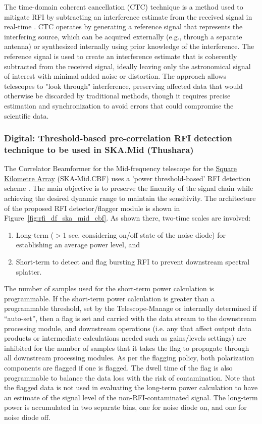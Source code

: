 The time-domain coherent cancellation (CTC) technique is a method used to mitigate RFI by subtracting an interference estimate from the received signal in real-time \cite{ellingson2022coherent}. CTC operates by generating a reference signal that represents the interfering source, which can be acquired externally (e.g., through a separate antenna) or synthesized internally using prior knowledge of the interference. The reference signal is used to create an interference estimate that is coherently subtracted from the received signal, ideally leaving only the astronomical signal of interest with minimal added noise or distortion. The approach allows telescopes to "look through" interference, preserving affected data that would otherwise be discarded by traditional methods, though it requires precise estimation and synchronization to avoid errors that could compromise the scientific data.

\subsubsection{Digital: Threshold-based pre-correlation RFI detection technique to be used in SKA.Mid (Thushara)}
\label{subsection:hardware:catalog:ska-mid}

The Correlator Beamformer for the Mid-frequency telescope for the \href{https://www.skao.int/en}{Square Kilometre Array} (SKA-Mid.CBF) uses a 'power threshold-based' RFI detection scheme \cite{ska_mid_cbf_rfi_2019}. The main objective is to preserve the linearity of the signal chain while achieving the desired dynamic range to maintain the sensitivity. The architecture of the proposed RFI detector/flagger module is shown in Figure~\ref{fig:rfi_df_ska_mid_cbf}. As shown there, two-time scales are involved:
\begin{enumerate}
    \item Long-term ($>$1 sec, considering on/off state of the noise diode) for establishing an average power level, and
    \item Short-term to detect and flag bursting RFI to prevent downstream spectral splatter.
\end{enumerate}

The number of samples used for the short-term power calculation is programmable. If the short-term power calculation is greater than a programmable threshold, set by the Telescope-Manage or internally determined if “auto-set”, then a flag is set and carried with the data stream to the downstream processing module, and downstream operations (i.e. any that affect output data products or intermediate calculations needed such as gains/levels settings) are inhibited for the number of samples that it takes the flag to propagate through all downstream processing modules. As per the flagging policy, both polarization components are flagged if one is flagged. The dwell time of the flag is also programmable to balance the data loss with the risk of contamination. Note that the flagged data is not used in evaluating the long-term power calculation to have an estimate of the signal level of the non-RFI-contaminated signal. The long-term power is accumulated in two separate bins, one for noise diode on, and one for noise diode off.

